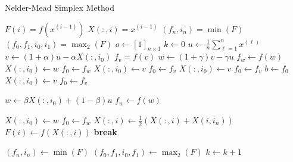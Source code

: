 \documentclass[letterpaper]{article}
\begin{document}
\begin{algorithm}[H]
    \caption{Nelder-Mead Simplex Method}
    \begin{algorithmic}[1]
             
                \State $F(i) = f(x^{(i - 1)})$ 
                \State $X(:, i) = x^{(i - 1)}$ 
            \EndFor 
            \State $(f_n, i_n) = \min(F)$ %
            \State $(f_0, f_1, i_0, i_1) = \max_{2}(F)$ %
            \State $o \gets [1]_{n \times 1}$ 
            \State $k \gets 0$
                \State $u \gets \frac{1}{n}\sum_{\ell = 1}^{n} x^{(\ell)}$
                \State $v \gets (1 + \alpha) u - \alpha X(:, i_0)$
                \State $f_v = f(v)$
                    \State $w \gets (1 + \gamma) v - \gamma u$
                    \State $f_w \gets f(w)$
                        \State $X(:, i_0) \gets w$
                        \State $f_0 \gets f_w$
                    \Else 
                        \State $X(:, i_0) \gets v$
                        \State $f_0 \gets f_v$
                    \EndIf    
                \Else 
                        \State $X(:, i_0) \gets v$
                        \State $f_0 \gets f_v$
                    \Else 
                        \State $b \gets f_0$
                            \State $X(:, i_0) \gets v$
                            \State $f_0 \gets f_v$
                        \EndIf 

                        \State $w \gets \beta X(:, i_0) + (1 - \beta) u$
                        \State $f_w \gets f(w)$

                            \State $X(:, i_0) \gets w$
                            \State $f_0 \gets f_w$
                        \Else 
                                    \State $X(:, i) \gets \frac{1}{2} (X(:, i) + X(i, i_n))$
                                    \State $F(i) \gets f(X(:, i))$
                                    \State \textbf{break}
                                \EndIf 
                            \EndFor 
                        \EndIf 
                    \EndIf 
                \EndIf 

                \State $(f_n, i_n) \gets \min(F)$
                \State $(f_0, f_1, i_0, f_1) \gets \max_{2}(F)$
                \State $k \gets k + 1$
            \EndWhile 
        \EndFunction 
    \end{algorithmic}
\end{algorithm}
\end{document}
